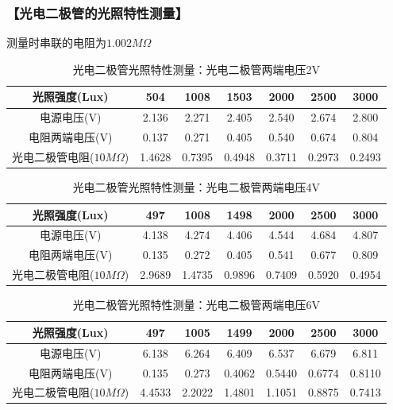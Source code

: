 \documentclass{ctexart}
\let\oldsubsubsection\subsubsection
\renewcommand{\subsubsection}[1]{\oldsubsubsection{\!\!\!\!\!\!【#1】}}
\begin{document}
\newpage
\subsubsection{光电二极管的光照特性测量}

测量时串联的电阻为$1.002M\Omega$

\begin{table}[H]
  \centering
  \begin{tabular}{|c|c|c|c|c|c|c|}
    \hline
    光照强度(Lux) &504&1008&1503&2000&2500&3000\\\hline
    电源电压(V) &2.136&2.271&2.405&2.540&2.674&2.800\\\hline
    电阻两端电压(V) &0.137&0.271&0.405&0.540&0.674&0.804\\\hline
    光电二极管电阻($10M\Omega$) & 1.4628&0.7395&0.4948&0.3711&0.2973&0.2493\\\hline
  \end{tabular}
  \caption{光电二极管光照特性测量：光电二极管两端电压2V}
\end{table}

\begin{table}[H]
  \centering
  \begin{tabular}{|c|c|c|c|c|c|c|}
    \hline
    光照强度(Lux) &497&1008&1498&2000&2500&3000\\\hline
    电源电压(V) &4.138&4.274&4.406&4.544&4.684&4.807\\\hline
    电阻两端电压(V) &0.135&0.272&0.405&0.541&0.677&0.809\\\hline
    光电二极管电阻($10M\Omega$) & 2.9689&1.4735&0.9896&0.7409&0.5920&0.4954\\\hline
  \end{tabular}
  \caption{光电二极管光照特性测量：光电二极管两端电压4V}
\end{table}

\begin{table}[H]
  \centering
  \begin{tabular}{|c|c|c|c|c|c|c|}
    \hline
    光照强度(Lux) &497&1005&1499&2000&2500&3000\\\hline
    电源电压(V) &6.138&6.264&6.409&6.537&6.679&6.811\\\hline
    电阻两端电压(V) &0.135&0.273&0.4062&0.5440&0.6774&0.8110\\\hline
    光电二极管电阻($10M\Omega$) & 4.4533&2.2022&1.4801&1.1051&0.8875&0.7413\\\hline
  \end{tabular}
  \caption{光电二极管光照特性测量：光电二极管两端电压6V}
\end{table}
\end{document}
